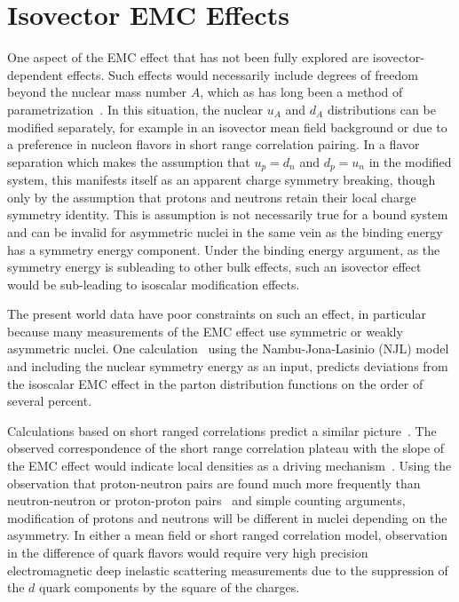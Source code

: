 \section{Isovector EMC Effects}

One aspect of the EMC effect that has not been fully explored are isovector-dependent effects.  Such effects would necessarily include degrees of freedom beyond the nuclear mass number $A$, which as has long been a method of parametrization~\cite{Malace:2014uea}.  In this situation, the nuclear $u_A$ and $d_A$ distributions can be modified separately, for example in an isovector mean field background or due to a preference in nucleon flavors in short range correlation pairing.  In a flavor separation which makes the assumption that $u_p = d_n$ and $d_p = u_n$ in the modified system, this manifests itself as an apparent charge symmetry breaking, though only by the assumption that protons and neutrons retain their local charge symmetry identity.  This is assumption is not necessarily true for a bound system and can be invalid for asymmetric nuclei in the same vein as the binding energy has a symmetry energy component.  Under the binding energy argument, as the symmetry energy is subleading to other bulk effects, such an isovector effect would be sub-leading to isoscalar modification effects.

The present world data have poor constraints on such an effect, in particular because many measurements of the EMC effect use symmetric or weakly asymmetric nuclei.  One calculation~\cite{Cloet:2009qs} using the Nambu-Jona-Lasinio (NJL) model and including the nuclear symmetry energy as an input, predicts deviations from the isoscalar EMC effect in the parton distribution functions on the order of several percent.   

Calculations based on short ranged correlations predict a similar picture~\cite{Sargsian:2012sm}.  The observed correspondence of the short range correlation plateau with the slope of the EMC effect would indicate local densities as a driving mechanism~\cite{PhysRevLett.106.052301}.  Using the observation that proton-neutron pairs are found much more frequently than neutron-neutron or proton-proton pairs~\cite{Subedi:2008zz} and simple counting arguments, modification of protons and neutrons will be different in nuclei depending on the asymmetry.  In either a mean field or short ranged correlation model, observation in the difference of quark flavors would require very high precision electromagnetic deep inelastic scattering measurements due to the suppression of the $d$ quark components by the square of the charges. 

